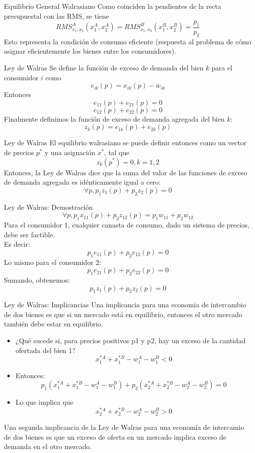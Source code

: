 \begin{frame}{Equilibrio General Walrasiano}
	Como coinciden la pendientes de la recta presupuestal con las RMS, se tiene
		$$RMS_{x_1,x_2}^{A}\left( x_{1}^{A},x_{2}^{A}\right)  =  RMS_{x_1,x_2}^{B}\left( x_{1}^{B},x_{2}^{B}\right)  =  \frac{p_{1}}{p_{2}}$$
	Esto representa la condición de consumo eficiente (respuesta al problema de cómo asignar eficientemente los bienes entre los consumidores).
\end{frame}
\begin{frame}{Ley de Walras}
	Se define la función de exceso de demanda del bien $k$ para el consumidor $i$ como
		$$e_{ik}(p)=x_{ik}(p)-\overline{w}_{ik}$$
	Entonces
		$$e_{11}(p) + e_{21}(p)=0$$
		$$e_{12}(p) + e_{22}(p)=0$$
	Finalmente definimos la función de exceso de demanda agregada del bien $k$:
		$$z_{k}(p) = e_{1k}(p)+e_{2k}(p)$$
\end{frame}
\begin{frame}{Ley de Walras}
	El equilibrio walrasiano se puede definir entonces como un vector de precios $p^*$ y una asignación $x^*$, tal que
		$$z_{k}(p^*)=0, k=1,2$$
	Entonces, la Ley de Walras dice que la suma del valor de las funciones de exceso de demanda agregada es idénticamente igual a cero:
		$$\forall p, p_1z_1(p)+p_2z_2(p)=0$$
\end{frame}
\begin{frame}{Ley de Walras: Demostración}
		$$\forall p, p_1x_{11}(p)+p_2z_{12}(p)=p_1w_{11}+p_2w_{12}$$
	Para el consumidor 1, cualquier canasta de consumo, dado un sistema de precios, debe ser factible.\\
	Es decir: 
		$$p_1e_{11}(p)+p_2e_{12}(p)=0$$
	Lo mismo para el consumidor 2:
		$$p_1e_{21}(p)+p_2e_{22}(p)=0$$
	Sumando, obtenemos:
		$$p_1z_1(p)+p_2z_2(p)=0$$
\end{frame}
\begin{frame}{Ley de Walras: Implicancias}
	Una implicancia para una economía de intercambio de dos bienes es que si un mercado está en equilibrio, entonces el otro mercado también debe estar en equilibrio.
		\begin{itemize}
			\item ¿Qué sucede si, para precios positivos p1 y p2, hay un exceso de la cantidad ofertada del bien 1?
				$$x_{1}^{*A}+x_{1}^{*B}-w_{1}^{A}-w_{1}^{B} < 0$$
			\item Entonces:
				$$p_1\left(x_{1}^{*A}+x_{1}^{*B}-w_{1}^{A}-w_{1}^{B} \right) + p_2\left(x_{2}^{*A}+x_{2}^{*B}-w_{2}^{A}-w_{2}^{B} \right)=0$$
			\item Lo que implica que
				$$x_{2}^{*A}+x_{2}^{*B}-w_{2}^{A}-w_{2}^{B} > 0$$
		\end{itemize}
	Una segunda implicancia de la Ley de Walras para una economía de intercamio de dos bienes es que un exceso de oferta en un mercado implica exceso de demanda en el otro mercado.
\end{frame}